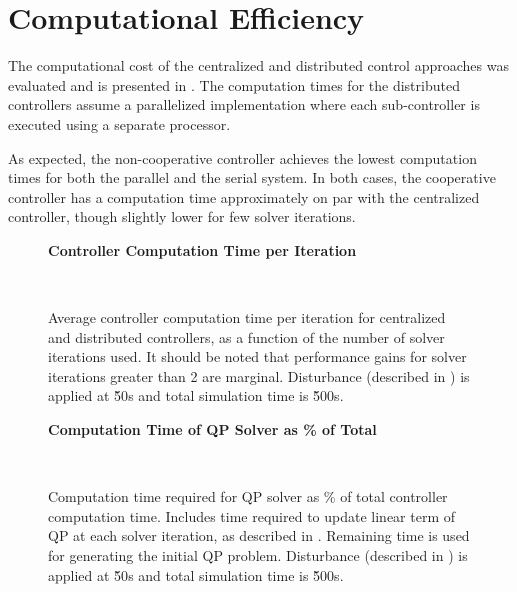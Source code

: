 \section{Computational Efficiency}
\label{sec:results:computation}

The computational cost of the centralized and distributed control approaches was evaluated and is presented in .
The computation times for the distributed controllers assume a parallelized implementation where each sub-controller is executed using a separate processor. 

As expected, the non-cooperative controller achieves the lowest computation times for both the parallel and the serial system.
In both cases, the cooperative controller has a computation time approximately on par with the centralized controller, though slightly lower for few solver iterations.


\ifmakeplots
\begin{figure}
  \centering
  {\large\bfseries Controller Computation Time per Iteration\\}
  \begin{subfigure}{0.75\linewidth}
    
  \end{subfigure}
  \\
  \begin{subfigure}{0.75\linewidth}
    
  \end{subfigure}
  \caption{Average controller computation time per iteration for centralized and distributed controllers, as a function of the number of solver iterations used. It should be noted that performance gains for solver iterations greater than 2 are marginal. Disturbance (described in ) is applied at \u{50}{s} and total simulation time is \u{500}{s}.}
  \label{fig:results:compcost}
\end{figure}

\begin{figure}
  \centering
  {\large\bfseries Computation Time of QP Solver as \% of Total\\}
  \begin{subfigure}{0.75\linewidth}
  
  \end{subfigure}
  \\
  \begin{subfigure}{0.75\linewidth}
  
  \end{subfigure}
  \caption{Computation time required for QP solver as \% of total controller computation time. Includes time required to update linear term of QP at each solver iteration, as described in . Remaining time is used for generating the initial QP problem. Disturbance (described in ) is applied at \u{50}{s} and total simulation time is \u{500}{s}.}
  \label{fig:results:qp-compcost}
\end{figure}
\fi
